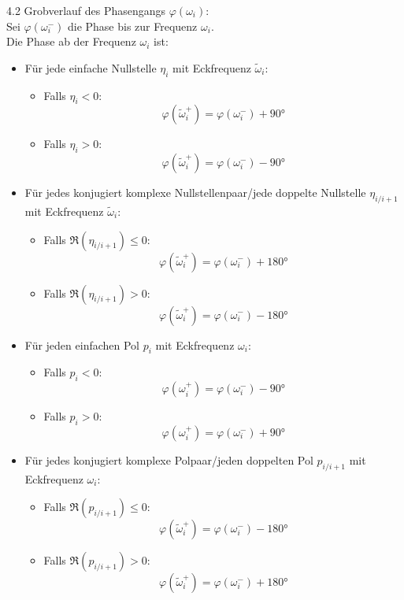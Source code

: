 \documentclass[10pt,a4paper]{article}
\begin{document}
4.2 Grobverlauf des Phasengangs $\varphi(\omega_i)$: \\
Sei $\varphi(\omega_i^-)$ die Phase bis zur Frequenz $\omega_i$. \\
Die Phase ab der Frequenz $\omega_i$ ist:
\begin{itemize}
	\item Für jede einfache Nullstelle $\eta_i$ mit Eckfrequenz $\tilde \omega_i$:
	\begin{itemize}
		\item Falls $\eta_i < 0$:
		$$
			\varphi(\tilde \omega_i^+) = \varphi(\omega_i^-) + 90°
		$$
		\item Falls $\eta_i > 0$:
		$$
			\varphi(\tilde \omega_i^+) = \varphi(\omega_i^-) - 90°
		$$
	\end{itemize}
	\item Für jedes konjugiert komplexe Nullstellenpaar/jede doppelte Nullstelle $\eta_{i/i+1}$ mit Eckfrequenz $\tilde \omega_i$:
	\begin{itemize}
		\item Falls $\Re(\eta_{i/i+1}) ≤ 0$:
		$$
			\varphi(\tilde \omega_i^+) = \varphi(\omega_i^-) + 180°
		$$
		\item Falls $\Re(\eta_{i/i+1}) > 0$:
		$$
			\varphi(\tilde \omega_i^+) = \varphi(\omega_i^-) - 180°
		$$
	\end{itemize}
	\item Für jeden einfachen Pol $p_i$ mit Eckfrequenz $\omega_i$:
	\begin{itemize}
		\item Falls $p_i < 0$:
		$$
			\varphi(\omega_i^+) = \varphi(\omega_i^-) - 90°
		$$
		\item Falls $p_i > 0$:
		$$
			\varphi(\omega_i^+) = \varphi(\omega_i^-) + 90°
		$$
	\end{itemize}
	\item Für jedes konjugiert komplexe Polpaar/jeden doppelten Pol $p_{i/i+1}$ mit Eckfrequenz $\omega_i$:
	\begin{itemize}
		\item Falls $\Re(p_{i/i+1}) ≤ 0$:
		$$
			\varphi(\tilde \omega_i^+) = \varphi(\omega_i^-) - 180°
		$$
		\item Falls $\Re(p_{i/i+1}) > 0$:
		$$
			\varphi(\tilde \omega_i^+) = \varphi(\omega_i^-) + 180°
		$$
	\end{itemize}
\end{itemize} ~\\
\end{document}
